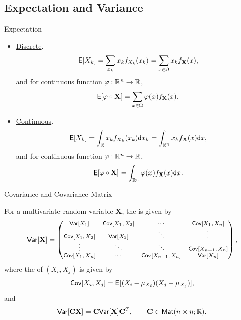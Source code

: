 \subsection{Expectation and Variance}

\begin{frame}{Expectation}

\begin{itemize}
	\item \underline{Discrete}.
	\begin{align*}
	\mathsf{E}[X_k] = \sum_{x_k}x_kf_{X_k}(x_k) = \sum_{x\in \Omega} x_k f_{\mathbf{X}}(x),
	\end{align*}
	and for continuous function $\varphi: \mathbb{R}^n\rightarrow \mathbb{R}$,
	\begin{align*}
	\mathsf{E}[\varphi\circ \mathbf{X}] = \sum_{x\in \Omega} \varphi(x)f_{\mathbf{X}}(x).
	\end{align*}
	\item \underline{Continuous}.
	\begin{align*}
	\mathsf{E}[X_k] = \int_{\mathbb{R}} x_k f_{X_k}(x_k) \mathsf{d}x_k = \int_{\mathbb{R}^n} x_kf_{\mathbf{X}}(x)\mathsf{d}x,
	\end{align*}
	and for continuous function $\varphi: \mathbb{R}^n\rightarrow \mathbb{R}$,
	\begin{align*}
	\mathsf{E}[\varphi\circ \mathbf{X}] = \int_{\mathbb{R}^n} \varphi(x)f_{\mathbf{X}}(x)\mathsf{d}x.
	\end{align*}
\end{itemize}

\end{frame}

\begin{frame}{Covariance and Covariance Matrix}

\justifying
{} For a multivariate random variable $\mathbf{X}$, the  is given by
\begin{align*}
\footnotesize
\mathsf{Var}[\mathbf{X}] = \begin{pmatrix}
\mathsf{Var}[X_1] & \mathsf{Cov}[X_1, X_2] & \cdots & \mathsf{Cov}[X_1, X_n] \\
\mathsf{Cov}[X_1, X_2] & \mathsf{Var}[X_2] & \ddots & \vdots \\
\vdots & \ddots & \ddots & \mathsf{Cov}[X_{n-1}, X_n] \\
\mathsf{Cov}[X_1, X_n] & \cdots & \mathsf{Cov}[X_{n-1}, X_n] & \mathsf{Var}[X_n]
\end{pmatrix},
\end{align*}
where the  of $(X_i, X_j)$ is given by
\begin{align*}
\mathsf{Cov}[X_i, X_j] = \mathsf{E}[(X_i-\mu_{X_i})(X_j-\mu_{X_j})],
\end{align*}
and
\begin{align*}
\mathsf{Var}[\mathbf{C}\mathbf{X}] = \mathbf{C}\mathsf{Var}[\mathbf{X}]\mathbf{C}^T, \qquad \mathbf{C} \in \mathsf{Mat}(n\times n; \mathbb{R}).
\end{align*}

\end{frame}


